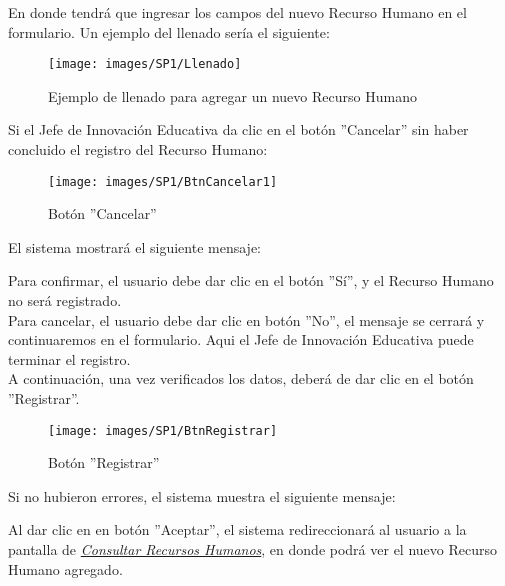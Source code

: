         En donde tendrá que ingresar los campos del nuevo Recurso Humano en el formulario. Un ejemplo del llenado sería el siguiente:
    
        \begin{figure}[!hbtp]
        	\centering
        	\hypertarget{ejreg}{\texttt{[image: images/SP1/Llenado]}}
        	\caption{Ejemplo de llenado para agregar un nuevo Recurso Humano}
        	\label{ejreg}
        \end{figure}

        Si el Jefe de Innovación Educativa da clic en el botón ''Cancelar'' sin haber concluido el registro del Recurso Humano:

        \begin{figure}[!hbtp]
        	\centering
        	\hypertarget{cancel1}{\texttt{[image: images/SP1/BtnCancelar1]}}
        	\caption{Botón ''Cancelar''}
        	\label{cancel1}
        \end{figure}

        El sistema mostrará el siguiente mensaje:
        
        Para confirmar, el usuario debe dar clic en el botón ''Sí'', y el Recurso Humano no será registrado.\\
        
        Para cancelar, el usuario debe dar clic en botón ''No'', el mensaje se cerrará y continuaremos en el formulario. Aqui el Jefe de Innovación Educativa puede terminar el registro.\\
        
        A continuación, una vez verificados los datos, deberá de dar clic en el botón ''Registrar''.
        \begin{figure}[!hbtp]
        	\centering
        	\hypertarget{btnreg}{\texttt{[image: images/SP1/BtnRegistrar]}}
        	\caption{Botón ''Registrar''}
        	\label{btnreg}
        \end{figure}

        Si no hubieron errores, el sistema muestra el siguiente mensaje:

        Al dar clic en en botón ''Aceptar'', el sistema redireccionará al usuario a la pantalla de \hyperlink{consultarrh}{\textit{Consultar Recursos Humanos}}, en donde podrá ver el nuevo Recurso Humano agregado.\\

